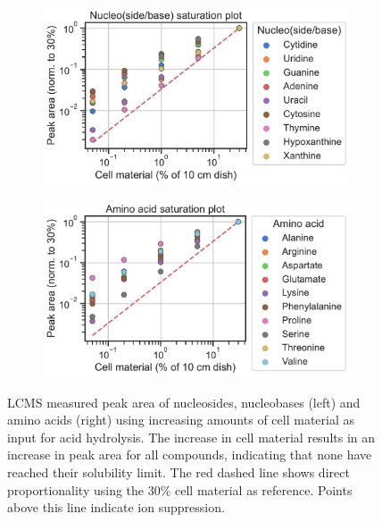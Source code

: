 \begin{figure}[ht]
     \centering
     \begin{subfigure}[b]{0.49\textwidth}
         \includegraphics[width=\textwidth]{figures/chap2/app/hydrolysis_nucl_saturation.pdf}
     \end{subfigure}
     \hfill
     \begin{subfigure}[b]{0.49\textwidth}
         \includegraphics[width=\textwidth]{figures/chap2/app/hydrolysis_AA_saturation.pdf}
     \end{subfigure}
        \caption[Nucleoside, nucleobase and amino acid, hydrolysis saturation.]{
        LCMS measured peak area of nucleosides, nucleobases (left) and amino acids (right) using increasing amounts of cell material as input for acid hydrolysis.
        The increase in cell material results in an increase in peak area for all compounds, indicating that none have reached their solubility limit.
        The red dashed line shows direct proportionality using the 30\% cell material as reference.
        Points above this line indicate ion suppression.
        }
        \label{fig:app_ch2:hydrolysis_saturation}
\end{figure}

